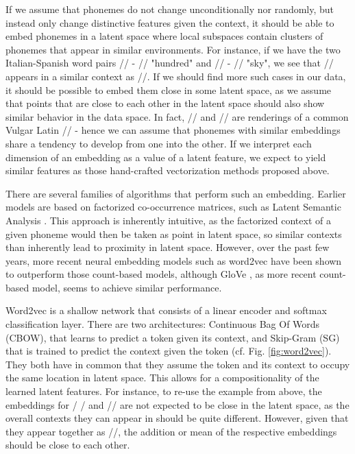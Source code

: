 \documentclass[6pt]{article}
\begin{document}
If we assume that phonemes do not change unconditionally nor randomly, but instead only change distinctive features given the context, it should be able to embed phonemes in a latent space where local subspaces contain clusters of phonemes that appear in similar environments. For instance, if we have the two Italian-Spanish word pairs // - // "hundred" and  // - // "sky", we see that // appears in a similar context as //. If we should find more such cases in our data, it should be possible to embed them close in some latent space, as we assume that points that are close to each other in the latent space should also show similar behavior in the data space. In fact, // and // are renderings of a common Vulgar Latin // - hence we can assume that phonemes with similar embeddings share a tendency to develop from one into the other. If we interpret each dimension of an embedding as a value of a latent feature, we expect to yield similar features as those hand-crafted vectorization methods proposed above.



There are several families of algorithms that perform such an embedding. Earlier models are based on factorized co-occurrence matrices, such as Latent Semantic Analysis \cite{landauer2013handbook}. This approach is inherently intuitive, as the factorized context of a given phoneme would then be taken as point in latent space, so similar contexts than inherently lead to proximity in latent space. However, over the past few years, more recent neural embedding models such as word2vec \cite{mikolov2013efficient,mikolov2013distributed,goldberg2014word2vec}  have been shown to outperform those count-based models, although GloVe \cite{pennington2014glove}, as more recent count-based model, seems to achieve similar performance.

Word2vec is a shallow network that consists of a linear encoder and softmax classification layer. There are two architectures: Continuous Bag Of Words (CBOW), that learns to predict a token given its context, and Skip-Gram (SG) that is trained to predict the context given the token (cf. Fig. \ref{fig:word2vec}). They both have in common that they assume the token and its context to occupy the same location in latent space. This allows for a compositionality of the learned latent features. For instance, to re-use the example from above, the embeddings for / / and // are not expected to be close in the latent space, as the overall contexts they can appear in should be quite different. However, given that they appear together as //, the addition or mean of the respective embeddings should be close to each other.
\end{document}
